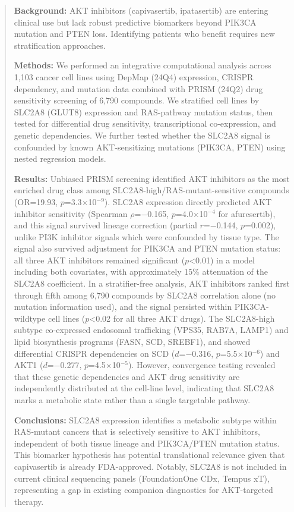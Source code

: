 \documentclass[12pt]{article}
\begin{document}
\begin{abstract}

\textbf{Background:}
AKT inhibitors (capivasertib, ipatasertib) are entering clinical use
but lack robust predictive biomarkers beyond PIK3CA mutation and PTEN loss.
Identifying patients who benefit requires new stratification approaches.

\textbf{Methods:}
We performed an integrative computational analysis across 1,103 cancer cell
lines using DepMap (24Q4) expression, CRISPR dependency, and mutation data
combined with PRISM (24Q2) drug sensitivity screening of 6,790 compounds.
We stratified cell lines by SLC2A8 (GLUT8) expression and RAS-pathway
mutation status, then tested for differential drug sensitivity,
transcriptional co-expression, and genetic dependencies. We further tested
whether the SLC2A8 signal is confounded by known AKT-sensitizing mutations
(PIK3CA, PTEN) using nested regression models.

\textbf{Results:}
Unbiased PRISM screening identified AKT inhibitors as the most enriched
drug class among SLC2A8-high/RAS-mutant-sensitive compounds
(OR=19.93, $p$=3.3$\times$10$^{-9}$). SLC2A8 expression directly
predicted AKT inhibitor sensitivity (Spearman $\rho$=$-$0.165,
$p$=4.0$\times$10$^{-4}$ for afuresertib), and this signal survived
lineage correction (partial $r$=$-$0.144, $p$=0.002), unlike PI3K
inhibitor signals which were confounded by tissue type. The signal also
survived adjustment for PIK3CA and PTEN mutation status: all three AKT
inhibitors remained significant ($p$<0.01) in a model including both
covariates, with approximately 15\% attenuation of the SLC2A8 coefficient.
In a stratifier-free analysis, AKT inhibitors ranked first through fifth
among 6,790 compounds by SLC2A8 correlation alone (no mutation
information used), and the signal persisted within PIK3CA-wildtype
cell lines ($p$<0.02 for all three AKT drugs).
The SLC2A8-high
subtype co-expressed endosomal trafficking (VPS35, RAB7A, LAMP1) and
lipid biosynthesis programs (FASN, SCD, SREBF1), and showed differential
CRISPR dependencies on SCD ($d$=$-$0.316, $p$=5.5$\times$10$^{-6}$) and
AKT1 ($d$=$-$0.277, $p$=4.5$\times$10$^{-5}$). However, convergence
testing revealed that these genetic dependencies and AKT drug sensitivity
are independently distributed at the cell-line level, indicating that
SLC2A8 marks a metabolic state rather than a single targetable pathway.

\textbf{Conclusions:}
SLC2A8 expression identifies a metabolic subtype within RAS-mutant cancers
that is selectively sensitive to AKT inhibitors, independent of both tissue
lineage and PIK3CA/PTEN mutation status. This biomarker
hypothesis has potential translational relevance given that capivasertib
is already FDA-approved. Notably, SLC2A8 is not included in current
clinical sequencing panels (FoundationOne CDx, Tempus xT), representing a
gap in existing companion diagnostics for AKT-targeted therapy.

\end{abstract}
\end{document}
